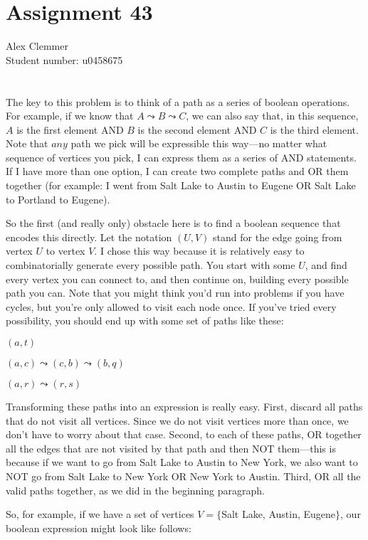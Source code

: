 \documentclass[a4paper]{article}
\begin{document}
\section*{Assignment 43}
Alex Clemmer\\
Student number: u0458675

\section{}

The key to this problem is to think of a path as a series of boolean operations. For example, if we know that $A \leadsto B \leadsto C$, we can also say that, in this sequence, $A$ is the first element AND $B$ is the second element AND $C$ is the third element. Note that $\textit{any}$ path we pick will be expressible this way---no matter what sequence of vertices you pick, I can express them as a series of AND statements. If I have more than one option, I can create two complete paths and OR them together (for example: I went from Salt Lake to Austin to Eugene OR Salt Lake to Portland to Eugene).

So the first (and really only) obstacle here is to find a boolean sequence that encodes this directly. Let the notation $(U, V)$ stand for the edge going from vertex $U$ to vertex $V$. I chose this way because it is relatively easy to combinatorially generate every possible path. You start with some $U$, and find every vertex you can connect to, and then continue on, building every possible path you can. Note that you might think you'd run into problems if you have cycles, but you're only allowed to visit each node once. If you've tried every possibility, you should end up with some set of paths like these:

$(a,t)$

$(a,c) \leadsto (c,b) \leadsto (b,q)$ 

$(a,r) \leadsto (r,s)$

Transforming these paths into an expression is really easy. First, discard all paths that do not visit all vertices. Since we do not visit vertices more than once, we don't have to worry about that case. Second, to each of these paths, OR together all the edges that are not visited by that path and then NOT them---this is because if we want to go from Salt Lake to Austin to New York, we also want to NOT go from Salt Lake to New York OR New York to Austin. Third, OR all the valid paths together, as we did in the beginning paragraph.

So, for example, if we have a set of vertices $V = \{$Salt Lake, Austin, Eugene$\}$, our boolean expression might look like follows:
\end{document}
